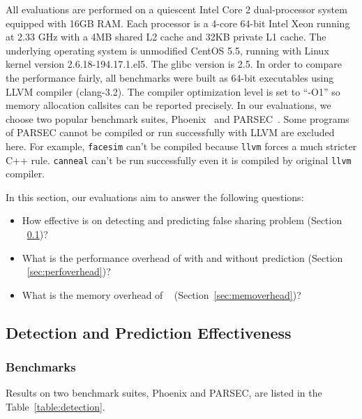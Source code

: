 \label{sec:evaluation}

All evaluations are performed on a quiescent Intel Core 2 dual-processor system equipped with 
16GB RAM. 
Each processor is a 4-core 64-bit Intel Xeon running at 2.33 GHz with a 4MB
shared L2 cache and 32KB private L1 cache. 
The underlying operating system is unmodified CentOS 5.5, running with Linux kernel
version 2.6.18-194.17.1.el5. The glibc version is 2.5. 
In order to compare the performance fairly, all benchmarks were built as 64-bit executables 
using LLVM compiler (clang-3.2). The compiler optimization level is set to ``-O1'' 
so memory allocation callsites can be reported precisely.
In our evaluations, 
we choose two popular benchmark suites, Phoenix~\cite{phoenix-hpca} 
and PARSEC~\cite{parsec}. 
Some programs of PARSEC cannot be compiled or run successfully with LLVM are excluded here.
For example, \texttt{facesim} can't be compiled 
because \texttt{llvm} forces a much stricter C++ rule. 
\texttt{canneal} can't be run successfully even it is compiled by original \texttt{llvm} compiler.

In this section, our evaluations aim to answer the following questions:
\begin{itemize}
\item
  How effective is \Predator{} on detecting and predicting false sharing problem (Section ~\ref{sec:effective})?

\item
  What is the performance overhead of \Predator{} with and without prediction
  (Section ~\ref{sec:perfoverhead})?

\item
  What is the memory overhead of \Predator{}~ (Section~\ref{sec:memoverhead})?
\end{itemize}


\subsection{Detection and Prediction Effectiveness}
\label{sec:effective}

\subsubsection{Benchmarks}
\label{sec:benchmarks}
Results on two benchmark suites, Phoenix and PARSEC, 
are listed in the Table~\ref{table:detection}. 


